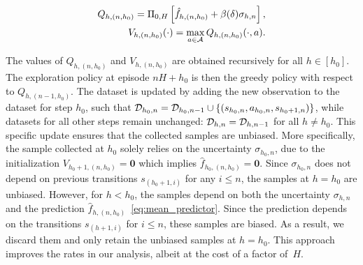 \begin{align*}
Q_{h,(n,h_0)} = \Pi_{0,H} \left[ \hat{f}_{h,(n,h_0)} + \beta(\delta) \sigma_{h,n} \right], \\
V_{h,(n,h_0)}(\cdot) = \max_{a \in \mathcal{A}} Q_{h,(n,h_0)}(\cdot, a) \label{eq:value_func}.
\end{align*}













%

The values of $Q_{h,(n,h_0)}$ and $V_{h,(n,h_0)}$ are obtained recursively for all $h\in[h_0]$. 
The exploration policy at episode $nH+h_0$ is then the greedy policy with respect to $Q_{h,(n-1,h_0)}$. The dataset is updated by adding the new observation to the dataset for step $h_0$, such that $\mathcal{D}_{h_0,n} = \mathcal{D}_{h_0,n-1}\cup \{(s_{h_0,n}, a_{h_0,n}, s_{h_0+1,n})\}$, while datasets for all other steps remain unchanged: $\mathcal{D}_{h,n} = \mathcal{D}_{h,n-1}$ for all $h\neq h_0$. This specific update ensures that the collected samples are unbiased. More specifically, the sample collected at $h_0$ solely relies on the uncertainty $\sigma_{h_0,n}$, due to the initialization $V_{h_0+1,(n,h_0)}=\bm{0}$ which implies $\hat{f}_{h_0,(n,h_0)}=\bm{0}$. Since $\sigma_{h_0,n}$ does not depend on previous transitions $s_{(h_0+1,i)}$ for any $i\leq n$, the samples at $h=h_0$ are unbiased. However, for \( h < h_0 \), the samples depend on both the uncertainty \( \sigma_{h,n} \) and the prediction \( \hat{f}_{h,(n,h_0)} \)~\eqref{eq:mean_predictor}. Since the prediction depends on the transitions $s_{(h+1,i)}$ for $i\leq n$, these samples are biased. As a result, we discard them and only retain the unbiased samples at \( h = h_0 \). This approach improves the rates in our analysis, albeit at the cost of a factor of~\( H \).

